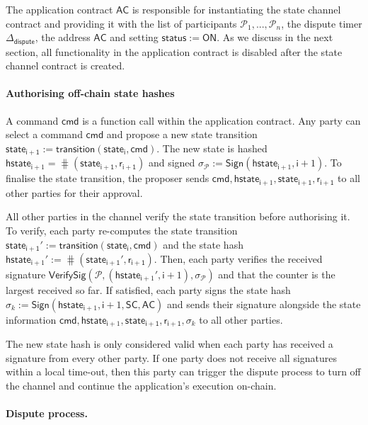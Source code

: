 \documentclass{llncs}
\newcommand{\chanstatus}{\mathsf{status}}
\newcommand{\chanon}{\mathsf{ON}}
\newcommand{\cmd}{\mathsf{cmd}}
\newcommand{\hstateplus}{\ensuremath{\mathsf{hstate}_{\monotoniccounter+1}}}
\newcommand{\monotoniccounter}{\mathsf{i}}
\newcommand{\stateinfoi}{\mathsf{state}_{\mathsf{i}}}
\newcommand{\stateinfoplus}{\mathsf{state}_{\mathsf{i+1}}}
\newcommand{\participant}{\mathcal{P}}
\newcommand{\ranplus}{\mathsf{r}_{\mathsf{i+1}}}
\newcommand{\statechannel}{\mathsf{SC}}
\newcommand{\sign}{\mathsf{Sign}}
\newcommand{\verifysig}{\mathsf{VerifySig}}
\newcommand{\appcontract}{\mathsf{AC}}
\newcommand{\timerdispute}{\mathsf{\Delta}_{\mathsf{dispute}}}
\begin{document}
The application contract $\appcontract$ is responsible for instantiating the state channel contract and providing it with the list of participants $\participant_{1},...,\participant_{n}$, the dispute timer $\timerdispute$, the address $\appcontract$ and setting $\chanstatus := \chanon$. 
As we discuss in the next section, all functionality in the application contract is disabled after the state channel contract is created. 

\paragraph{Authorising off-chain state hashes}
A command $\cmd$ is a function call within the application contract.
Any party can select a command $\cmd$ and propose a new state transition $\stateinfoplus := \mathsf{transition}(\stateinfoi, \cmd)$.
The new state is hashed  $\hstateplus = \hash(\stateinfoplus, \ranplus)$ and signed  $\sigma_{\participant} := \sign(\hstateplus,\monotoniccounter+1)$.
To finalise the state transition, the proposer sends $\cmd,\hstateplus, \stateinfoplus, \ranplus$ to all other parties for their approval.

All other parties in the channel verify the state transition before authorising it. 
To verify, each party re-computes the state transition $\stateinfoplus' := \mathsf{transition}(\stateinfoi, \cmd)$ and the state hash $\hstateplus' := \hash(\stateinfoplus', \ranplus)$.
Then, each party verifies the received signature $\verifysig(\participant, (\hstateplus', \monotoniccounter+1), \sigma_{\participant})$ and that the counter is the largest received so far. 
If satisfied, each party signs the state hash  $\sigma_{k} := \sign(\hstateplus,\monotoniccounter+1, \statechannel, \appcontract)$ and sends their signature alongside the state information $\cmd,\hstateplus, \stateinfoplus, \ranplus, \sigma_{k}$ to all other parties. 

The new state hash is only considered valid when each party has received a signature from every other party.  If one party does not receive all signatures within a local time-out, then this party can trigger the dispute process to turn off the channel and continue the application's execution on-chain. 

\paragraph{Dispute process.} 
\end{document}
